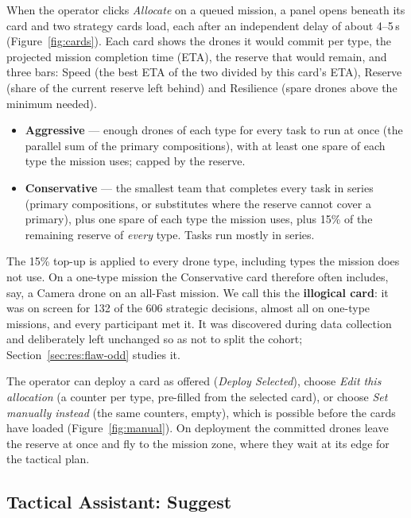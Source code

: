 \documentclass[10pt]{article}
\theoremstyle{definition}
\begin{document}
When the operator clicks \emph{Allocate} on a queued mission, a panel opens beneath its card and two strategy cards
load, each after an independent delay of about 4--5\,s (Figure~\ref{fig:cards}). Each card shows the drones it would
commit per type, the projected mission completion time (ETA), the reserve that would remain, and three bars: Speed
(the best ETA of the two divided by this card's ETA), Reserve (share of the current reserve left behind) and
Resilience (spare drones above the minimum needed).
\begin{itemize}[noitemsep]
  \item \textbf{Aggressive} --- enough drones of each type for every task to run at once (the parallel sum of the
        primary compositions), with at least one spare of each type the mission uses; capped by the reserve.
  \item \textbf{Conservative} --- the smallest team that completes every task in series (primary compositions, or
        substitutes where the reserve cannot cover a primary), plus one spare of each type the mission uses, plus
        15\% of the remaining reserve of \emph{every} type. Tasks run mostly in series.
\end{itemize}
The 15\% top-up is applied to every drone type, including types the mission does not use. On a one-type mission the
Conservative card therefore often includes, say, a Camera drone on an all-Fast mission. We call this the
\textbf{illogical card}: it was on screen for 132 of the 606 strategic decisions, almost all on one-type missions, and
every participant met it. It was discovered during data collection and deliberately left unchanged so as not to split
the cohort; Section~\ref{sec:res:flaw-odd} studies it.

The operator can deploy a card as offered (\emph{Deploy Selected}), choose \emph{Edit this allocation} (a counter per
type, pre-filled from the selected card), or choose \emph{Set manually instead} (the same counters, empty), which is
possible before the cards have loaded (Figure~\ref{fig:manual}). On deployment the committed drones leave the reserve
at once and fly to the mission zone, where they wait at its edge for the tactical plan.

\subsection{Tactical Assistant: Suggest}\label{sec:tactical}
\end{document}
